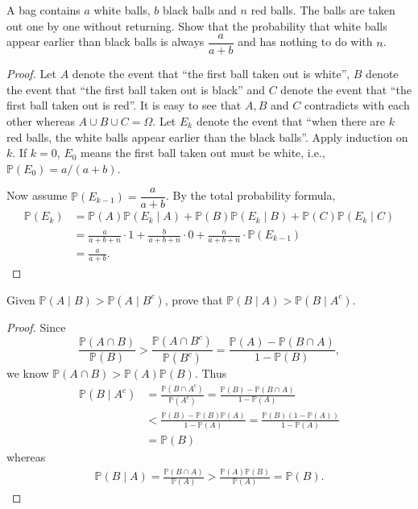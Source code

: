 \documentclass[11pt,singlecolumn, openany, citestyle=authoryear]{elegantbook}
\begin{document}
\begin{CJK}{UTF8}{gbsn}
\begin{exercise}
    A bag contains $a$ white balls, $b$ black balls and $n$ red balls. The balls are 
    taken out one by one without returning. Show that the probability that white balls 
    appear earlier than black balls is always $\dfrac{a}{a+b}$ and has nothing to do with 
    $n$. 
\end{exercise}
\begin{proof}
    Let $A$ denote the event that ``the first ball taken out is white'', $B$ denote the 
    event that ``the first ball taken out is black'' and $C$ denote the event that 
    ``the first ball taken out is red''. It is easy to see that $A,B$ and $C$ contradicts 
    with each other whereas $A \cup B \cup C = \Omega$. Let $E_k$ denote the event that 
    ``when there are $k$ red balls, the white balls appear earlier than the black balls''.
    Apply induction on $k$. If $k=0$, $E_0$ means the first ball taken out must be white,
    i.e., $\mathbb{P}(E_0) = a/(a+b)$.

    Now assume $\mathbb{P}(E_{k-1})=\dfrac{a}{a+b}$. By the total probability formula,
    \begin{align*}
        \mathbb{P}(E_k) &= \mathbb{P}(A)\mathbb{P}(E_k\mid A) + 
        \mathbb{P}(B)\mathbb{P}(E_k\mid B) + \mathbb{P}(C)\mathbb{P}(E_k\mid C) \\
        &= \frac{a}{a+b+n}\cdot 1 + \frac{b}{a+b+n}\cdot 0 + \frac{n}{a+b+n}\cdot 
        \mathbb{P}(E_{k-1})\\
        &=\frac{a}{a+b}. 
    \end{align*}
\end{proof}


\begin{exercise}
    Given $\mathbb{P}(A\mid B)>\mathbb{P}(A \mid B^c)$, prove that 
    $\mathbb{P}(B\mid A)>\mathbb{P}(B \mid A^c)$.
\end{exercise}
\begin{proof}
    Since 
    $$\frac{\mathbb{P}(A \cap B)}{\mathbb{P}(B)} > 
    \frac{\mathbb{P}(A \cap B^c)}{\mathbb{P}(B^c)} = 
    \frac{\mathbb{P}(A)-\mathbb{P}(B \cap A)}{1-\mathbb{P}(B)},
    $$
    we know $\mathbb{P}(A\cap B)>\mathbb{P}(A)\mathbb{P}(B)$.
    Thus 
    \begin{align*}
        \mathbb{P}(B \mid A^c) &= 
        \frac{\mathbb{P}(B\cap A^c)}{\mathbb{P}(A^c)} = 
        \frac{\mathbb{P}(B) - \mathbb{P}(B\cap A)}{1-\mathbb{P}(A)} \\
        &<\frac{\mathbb{P}(B) - \mathbb{P}(B)\mathbb{P}(A)}{1-\mathbb{P}(A)}
        = \frac{\mathbb{P}(B) (1- \mathbb{P}(A))}{1-\mathbb{P}(A)} \\
        &= \mathbb{P}(B)
    \end{align*}
    whereas 
    \begin{align*}
        \mathbb{P}(B \mid A) = \frac{\mathbb{P}(B \cap A)}{\mathbb{P}(A)}>
        \frac{\mathbb{P}(A)\mathbb{P}(B)}{\mathbb{P}(A)}=\mathbb{P}(B).
    \end{align*}
\end{proof}


\end{CJK}
\end{document}
